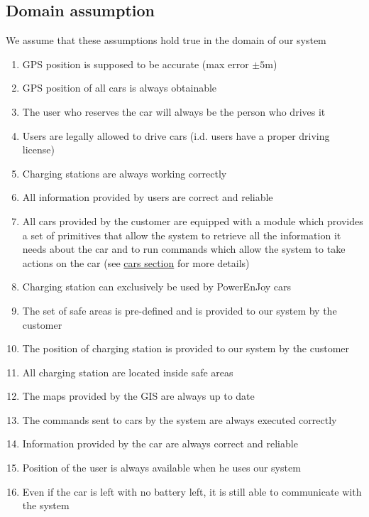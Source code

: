 \subsection{Domain assumption}
	We assume that these assumptions hold true in the domain of our system 
	\begin{enumerate}[label=\textbf{DA\arabic*}]
		\item GPS position is supposed to be accurate (max error $\pm5$m)
		\item GPS position of all cars is always obtainable
		\item The user who reserves the car will always be the person who drives it
		\item Users are legally allowed to drive cars (i.d. users have a proper driving license)
		\item Charging stations are always working correctly
		\item \label{da:userGivenInfo} All information provided by users are correct and reliable
		\item All cars provided by the customer are equipped with a module which provides a set of
		primitives that allow the system to retrieve all the information it needs about
		the car and to run commands which allow the system to take actions on the car (see \hyperref[sec:cars]{cars section} for more details)
		\item Charging station can exclusively be used by PowerEnJoy cars
		\item The set of safe areas is pre-defined and is provided to our system by the customer
		\item The position of charging station is provided to our system by the customer
		\item All charging station are located inside safe areas
		\item The maps provided by the GIS are always up to date
		\item The commands sent to cars by the system are always executed
		correctly
		\item Information provided by the car are always correct and reliable
		\item Position of the user is always available when he uses our system
		\item \label{da:zeroBattery}Even if the car is left with no battery left, it is still able to communicate with the system
		
	\end{enumerate}
	
\clearpage
